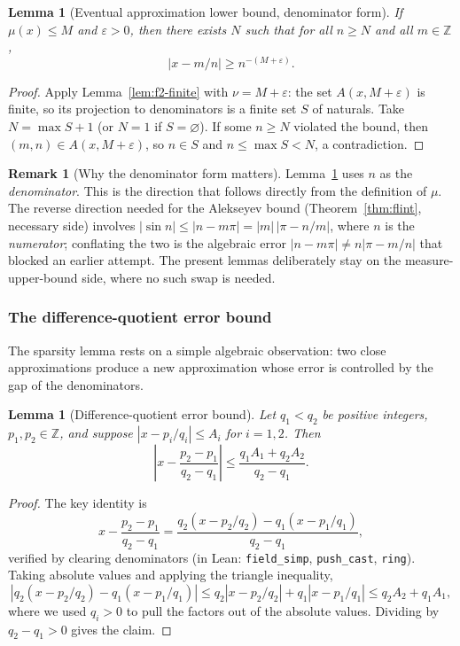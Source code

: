 \documentclass[11pt]{amsart}
\newtheorem{lemma}[theorem]{Lemma}
\theoremstyle{definition}
\newtheorem{remark}[theorem]{Remark}
\theoremstyle{remark}
\numberwithin{equation}{section}
\newcommand{\Z}{\mathbb{Z}}
\newcommand{\irr}{\mu}
\begin{document}
\begin{lemma}[Eventual approximation lower bound, denominator form]\label{lem:f2-eventual}
If $\irr(x)\le M$ and $\varepsilon>0$, then there exists $N$ such that for all $n\ge N$ and all $m\in\Z$,
\[
|x-m/n|\ge n^{-(M+\varepsilon)}.
\]
\end{lemma}
\begin{proof}
Apply Lemma~\ref{lem:f2-finite} with $\nu=M+\varepsilon$: the set $A(x,M+\varepsilon)$ is finite, so its projection to denominators is a finite set $S$ of naturals. Take $N=\max S+1$ (or $N=1$ if $S=\varnothing$). If some $n\ge N$ violated the bound, then $(m,n)\in A(x,M+\varepsilon)$, so $n\in S$ and $n\le\max S<N$, a contradiction.
\end{proof}

\begin{remark}[Why the denominator form matters]\label{rem:f2-denom}
Lemma~\ref{lem:f2-eventual} uses $n$ as the \emph{denominator}. This is the direction that follows directly from the definition of $\irr$. The reverse direction needed for the Alekseyev bound (Theorem~\ref{thm:flint}, necessary side) involves $|\sin n|\le|n-m\pi|=|m|\,|\pi-n/m|$, where $n$ is the \emph{numerator}; conflating the two is the algebraic error $|n-m\pi|\ne n|\pi-m/n|$ that blocked an earlier attempt. The present lemmas deliberately stay on the measure-upper-bound side, where no such swap is needed.
\end{remark}

\subsubsection{The difference-quotient error bound}

The sparsity lemma rests on a simple algebraic observation: two close approximations produce a new approximation whose error is controlled by the gap of the denominators.

\begin{lemma}[Difference-quotient error bound]\label{lem:f2-dq}
Let $q_1<q_2$ be positive integers, $p_1,p_2\in\Z$, and suppose $|x-p_i/q_i|\le A_i$ for $i=1,2$. Then
\[
\left|x-\frac{p_2-p_1}{q_2-q_1}\right|\le\frac{q_1 A_1+q_2 A_2}{q_2-q_1}.
\]
\end{lemma}
\begin{proof}
The key identity is
\[
x-\frac{p_2-p_1}{q_2-q_1}=\frac{q_2(x-p_2/q_2)-q_1(x-p_1/q_1)}{q_2-q_1},
\]
verified by clearing denominators (in Lean: \texttt{field\_simp}, \texttt{push\_cast}, \texttt{ring}). Taking absolute values and applying the triangle inequality,
\[
|q_2(x-p_2/q_2)-q_1(x-p_1/q_1)|\le q_2|x-p_2/q_2|+q_1|x-p_1/q_1|\le q_2 A_2+q_1 A_1,
\]
where we used $q_i>0$ to pull the factors out of the absolute values. Dividing by $q_2-q_1>0$ gives the claim.
\end{proof}
\end{document}
